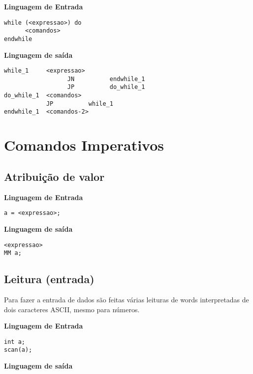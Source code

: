 \textbf{Linguagem de Entrada} \\

\begin{lstlisting}
while (<expressao>) do
      <comandos>
endwhile
\end{lstlisting}
 
\textbf{Linguagem de saída} \\

\begin{lstlisting}
while_1     <expressao>
                  JN          endwhile_1
                  JP          do_while_1
do_while_1  <comandos>
            JP          while_1
endwhile_1  <comandos-2>
\end{lstlisting}

\section{Comandos Imperativos}

\subsection{Atribuição de valor}

\textbf{Linguagem de Entrada} \\

\begin{lstlisting}
a = <expressao>;
\end{lstlisting}

\textbf{Linguagem de saída} \\

\begin{lstlisting}
<expressao>
MM a;
\end{lstlisting}

\subsection{Leitura (entrada)}
Para fazer a entrada de dados são feitas várias leituras de words interpretadas de dois caracteres ASCII, mesmo para números.

\textbf{Linguagem de Entrada} \\

\begin{lstlisting}
int a;
scan(a);
\end{lstlisting}

\textbf{Linguagem de saída} \\


